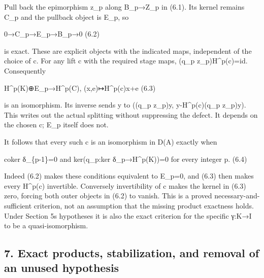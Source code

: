 Pull back the epimorphism z\_\allowbreak{}p along B\_\allowbreak{}p\allowbreak{}→Z\_\allowbreak{}p in (6.1)\allowbreak{}. Its kernel remains C\_\allowbreak{}p and the pullback object is E\_\allowbreak{}p,\allowbreak{} so

0\allowbreak{}→C\_\allowbreak{}p\allowbreak{}→E\_\allowbreak{}p\allowbreak{}→B\_\allowbreak{}p\allowbreak{}→0 (6.2)\allowbreak{}

is exact. These are explicit objects with the indicated maps,\allowbreak{} independent of the choice of c. For any lift c with the required stage maps,\allowbreak{} (q\_\allowbreak{}p z\_\allowbreak{}p)\allowbreak{}H\textasciicircum{}p(c)\allowbreak{}\allowbreak{}=id. Consequently

H\textasciicircum{}p(K)\allowbreak{}\allowbreak{}⊕E\_\allowbreak{}p\allowbreak{}→H\textasciicircum{}p(C)\allowbreak{},\allowbreak{} (x,\allowbreak{}e)\allowbreak{}\allowbreak{}↦H\textasciicircum{}p(c)\allowbreak{}x\allowbreak{}+e (6.3)\allowbreak{}

is an isomorphism. Its inverse sends y to ((q\_\allowbreak{}p z\_\allowbreak{}p)\allowbreak{}y,\allowbreak{} y-H\textasciicircum{}p(c)\allowbreak{}(q\_\allowbreak{}p z\_\allowbreak{}p)\allowbreak{}y)\allowbreak{}. This writes out the actual splitting without suppressing the defect. It depends on the chosen c; E\_\allowbreak{}p itself does not.

It follows that every such c is an isomorphism in D(A)\allowbreak{} exactly when

coker δ\_\allowbreak{}\{p-1\}\allowbreak{}=0 and ker(q\_\allowbreak{}p:\allowbreak{}ker δ\_\allowbreak{}p\allowbreak{}→H\textasciicircum{}p(K)\allowbreak{})\allowbreak{}\allowbreak{}=0 for every integer p. (6.4)\allowbreak{}

Indeed (6.2)\allowbreak{} makes these conditions equivalent to E\_\allowbreak{}p\allowbreak{}=0,\allowbreak{} and (6.3)\allowbreak{} then makes every H\textasciicircum{}p(c)\allowbreak{} invertible. Conversely invertibility of c makes the kernel in (6.3)\allowbreak{} zero,\allowbreak{} forcing both outer objects in (6.2)\allowbreak{} to vanish. This is a proved necessary-and-sufficient criterion,\allowbreak{} not an assumption that the missing product exactness holds. Under Section 5\textquotesingle s hypotheses it is also the exact criterion for the specific γ:\allowbreak{}K\allowbreak{}→I to be a quasi-isomorphism.

\subsection{\texorpdfstring{7. Exact products,\allowbreak{} stabilization,\allowbreak{} and removal of an unused hypothesis}{7. Exact   and removal of an unused hypothesis}}\label{proofs-10435-10686-exact-products-stabilization-and-removal-of-an-unused-hypothesis}

